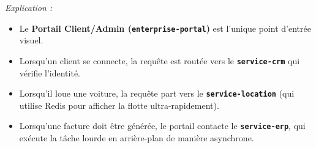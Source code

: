 \textit{Explication :}
\begin{itemize}
    \item Le \textbf{Portail Client/Admin (\texttt{enterprise-portal})} est l'unique point d'entrée visuel.
    \item Lorsqu'un client se connecte, la requête est routée vers le \textbf{\texttt{service-crm}} qui vérifie l'identité.
    \item Lorsqu'il loue une voiture, la requête part vers le \textbf{\texttt{service-location}} (qui utilise Redis pour afficher la flotte ultra-rapidement).
    \item Lorsqu'une facture doit être générée, le portail contacte le \textbf{\texttt{service-erp}}, qui exécute la tâche lourde en arrière-plan de manière asynchrone.
\end{itemize}
